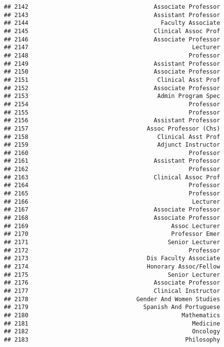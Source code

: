 \documentclass[
]{article}
\begin{document}
\begin{verbatim}
## 2142                                    Associate Professor
## 2143                                    Assistant Professor
## 2144                                      Faculty Associate
## 2145                                    Clinical Assoc Prof
## 2146                                    Associate Professor
## 2147                                               Lecturer
## 2148                                              Professor
## 2149                                    Assistant Professor
## 2150                                    Associate Professor
## 2151                                     Clinical Asst Prof
## 2152                                    Associate Professor
## 2153                                     Admin Program Spec
## 2154                                              Professor
## 2155                                              Professor
## 2156                                    Assistant Professor
## 2157                                  Assoc Professor (Chs)
## 2158                                     Clinical Asst Prof
## 2159                                     Adjunct Instructor
## 2160                                              Professor
## 2161                                    Assistant Professor
## 2162                                              Professor
## 2163                                    Clinical Assoc Prof
## 2164                                              Professor
## 2165                                              Professor
## 2166                                               Lecturer
## 2167                                    Associate Professor
## 2168                                    Associate Professor
## 2169                                         Assoc Lecturer
## 2170                                         Professor Emer
## 2171                                        Senior Lecturer
## 2172                                              Professor
## 2173                                  Dis Faculty Associate
## 2174                                  Honorary Assoc/Fellow
## 2175                                        Senior Lecturer
## 2176                                    Associate Professor
## 2177                                    Clinical Instructor
## 2178                               Gender And Women Studies
## 2179                                 Spanish And Portuguese
## 2180                                            Mathematics
## 2181                                               Medicine
## 2182                                               Oncology
## 2183                                             Philosophy

\end{verbatim}
\end{document}
